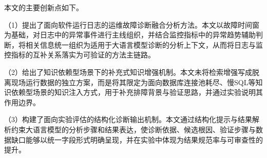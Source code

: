 
本文的主要创新点如下。

（1）提出了面向软件运行日志的运维故障诊断融合分析方法。本文以故障时间窗为基础，对日志中的异常事件进行主线组织，并结合监控指标中的异常趋势辅助判断，将相关信息统一组织为适用于大语言模型诊断的分析上下文，从而将日志与监控指标的互补关系落实为可验证的方法主链路。

（2）给出了知识依赖型场景下的补充式知识增强机制。本文未将检索增强写成脱离现场运行数据的独立方案，而是将其限定为面向数据库连接池耗尽、慢SQL等知识依赖型场景的知识注入方式，用于补充排障背景与验证思路，并通过实验说明其作用边界。

（3）构建了面向实验评估的结构化诊断输出机制。本文通过结构化提示与结果解析约束大语言模型的分析步骤和结果表达，使诊断依据、候选根因、验证步骤与数据缺口能够以统一字段形式明确呈现，并在实验中体现为结果规范率与可审查性的提升。
